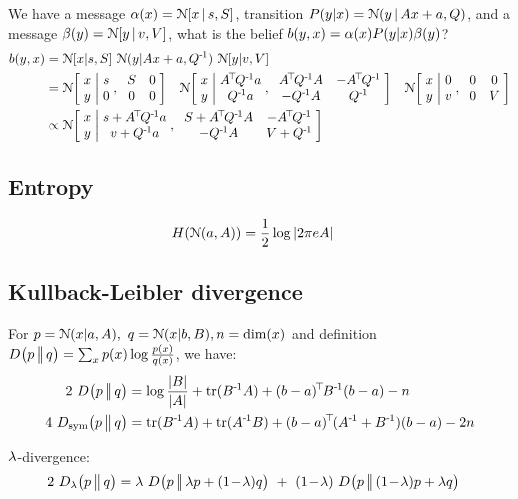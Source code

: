 We have a message $\alpha(x)={\cal N}[x \,|\, s,S]$,
 transition $P(y|x) = {\cal N}(y \,|\, A x+a,Q)$, and a message
 $\beta(y)={\cal N}[y \,|\, v,V]$, what is the belief $b(y,x)=\alpha(x)P(y|x)\beta(y)$?
\begin{align}
b(y,x)
 &= \NN[x|s,S]~ \NN(y|A x+a,Q^\1)~ \NN[y|v,V] \\
&=
\NN\bigg[ \arr{c}{x\\ y} \bigg| \arr{c}{s \\ 0} ,~
             \arr{cc}{S & 0 \\ 0 & 0} \bigg]~~~
\NN\bigg[ \arr{c}{x\\ y} \bigg| \arr{c}{A^\T Q^\1 a \\ Q^\1 a} ,~
             \arr{cc}{A^\T Q^\1 A & -A^\T Q^\1 \\ -Q^\1 A & Q^\1} \bigg]~~~
\NN\bigg[ \arr{c}{x\\ y} \bigg| \arr{c}{0 \\ v} ,~
             \arr{cc}{0 & 0 \\ 0 & V} \bigg] \\
&\propto
\NN\bigg[ \arr{c}{x\\ y} \bigg| \arr{c}{s + A^\T Q^\1 a\\ v + Q^\1 a} ,~
             \arr{cc}{S + A^\T Q^\1 A & -A^\T Q^\1 \\ -Q^\1 A & V+Q^\1} \bigg]
\end{align}

\subsection{Entropy}
\begin{align}
H({\cal N}(a,A)) &= \frac{1}{2} \log |2\pi e A|
\end{align}

\subsection{Kullback-Leibler divergence}

For $p={\cal N}(x|a,A),~ q={\cal N}(x|b,B), n = \text{dim}(x)$ and definition
$D_{{}}\big(p\,\big|\!\big|\,q\big) = \sum_x p(x) \log\frac{p(x)}{q(x)}$, we have:
\begin{align}
2~ D_{{}}\big(p\,\big|\!\big|\,q\big)
&= \log\frac{|B|}{|A|} + {\rm tr}(B^{{\hspace*{-.0pt}\text{\rm -}\hspace*{-.5pt}}1}A) + (b-a)^{\!\top\!} B^{{\hspace*{-.0pt}\text{\rm -}\hspace*{-.5pt}}1} (b-a) - n \\
4~ D_\text{sym}\big(p \,\big\Vert\, q\big)
&= {\rm tr}(B^{{\hspace*{-.0pt}\text{\rm -}\hspace*{-.5pt}}1}A) + {\rm tr}(A^{{\hspace*{-.0pt}\text{\rm -}\hspace*{-.5pt}}1}B) + (b-a)^{\!\top\!} (A^{{\hspace*{-.0pt}\text{\rm -}\hspace*{-.5pt}}1}+B^{{\hspace*{-.0pt}\text{\rm -}\hspace*{-.5pt}}1}) (b-a) - 2n
\end{align}

$\lambda$-divergence:
\begin{align}
2~ D_\l\big(p \,\big\Vert\, q\big)
&= \l~ \kld{p}{\l p+(1\!-\!\l)q} ~+~ (1\!-\!\l)~ \kld{p}{(1\!-\!\l) p + \l q}
\end{align}

